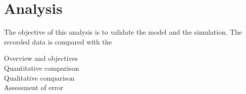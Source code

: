 \chapter{Analysis}

The objective of this analysis is to validate the model and the simulation. The recorded data is compared with the 


Overview and objectives\\
Quantitative comparison\\
Qualitative comparison\\
Assessment of error\\
